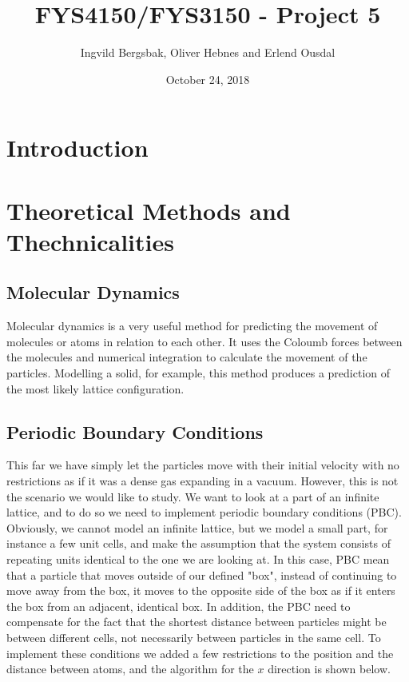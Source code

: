 \documentclass{article}
\begin{document}
\title{\textbf{FYS4150/FYS3150 - Project 5}}
\author{Ingvild Bergsbak, Oliver Hebnes and Erlend Ousdal}
\date{October 24, 2018}


\maketitle
\begin{abstract}
\end{abstract}
\section{Introduction}




\section{Theoretical Methods and Thechnicalities}
\subsection{Molecular Dynamics}
Molecular dynamics is a very useful method for predicting the movement of molecules or atoms in relation to each other. It uses the Coloumb forces between the molecules and numerical integration to calculate the movement of the particles. Modelling a solid, for example, this method produces a prediction of the most likely lattice configuration.

\subsection{Periodic Boundary Conditions}
This far we have simply let the particles move with their initial velocity with no restrictions as if it was a dense gas expanding in a vacuum. However, this is not the scenario we would like to study. We want to look at a part of an infinite lattice, and to do so we need to implement periodic boundary conditions (PBC). Obviously, we cannot model an infinite lattice, but we model a small part, for instance a few unit cells, and make the assumption that the system consists of repeating units identical to the one we are looking at. In this case, PBC mean that a particle that moves outside of our defined "box", instead of continuing to move away from the box, it moves to the opposite side of the box as if it enters the box from an adjacent, identical box. In addition, the PBC need to compensate for the fact that the shortest distance between particles might be between different cells, not necessarily between particles in the same cell. To implement these conditions we added a few restrictions to the position and the distance between atoms, and the algorithm for the $x$ direction is shown below.
\end{document}
